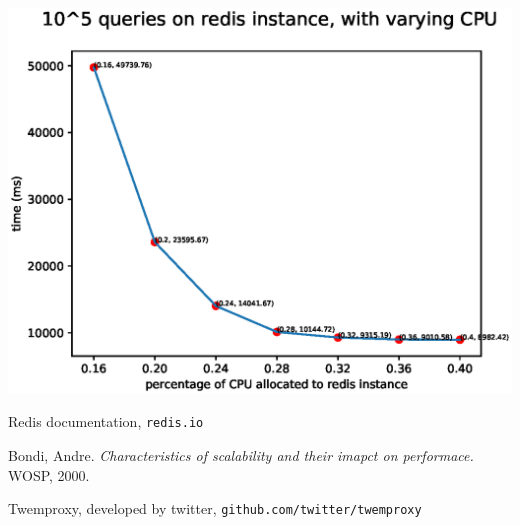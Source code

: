 \documentclass[11pt]{article}
\begin{document}
\includegraphics[width=\textwidth]{fig4.eps}






\pagebreak
\begin{thebibliography}{9}

Redis documentation,
\texttt{redis.io}
        
Bondi, Andre.
\textit{Characteristics of scalability and their imapct on performace.}
WOSP, 2000.

Twemproxy, developed by twitter,
\texttt{github.com/twitter/twemproxy}

\end{thebibliography}
\end{document}
